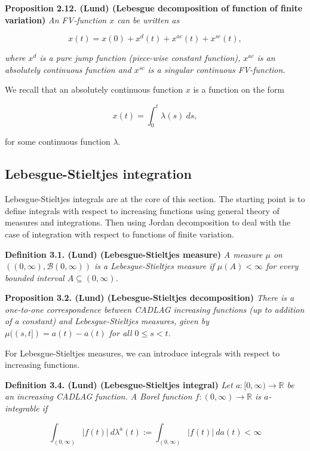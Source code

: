 \documentclass[a4paper,12pt,openany]{book}
\begin{document}
\textbf{Proposition 2.12. (Lund) (Lebesgue decomposition of function of finite variation)} \emph{An FV-function \(x\) can be written as}

\[
x(t)=x(0)+x^d(t)+x^{ac}(t)+x^{sc}(t),
\]

\emph{where \(x^d\) is a pure jump function (piece-wise constant function), \(x^{ac}\) is an absolutely continuous function and \(x^{sc}\) is a singular continuous FV-function.}

We recall that an absolutely continuous function \(x\) is a function on the form

\[
x(t)=\int_0^t\lambda(s)\ ds,
\]

for some continuous function \(\lambda\).

\hypertarget{lebesgue-stieltjes-integration}{%
\subsection{Lebesgue-Stieltjes integration}\label{lebesgue-stieltjes-integration}}

Lebesgue-Stieltjes integrals are at the core of this section. The starting point is to define integrals with respect to increasing functions using general theory of measures and integrations. Then using Jordan decomposition to deal with the case of integration with respect to functions of finite variation.

\textbf{Definition 3.1. (Lund) (Lebesgue-Stieltjes measure)} \emph{A measure \(\mu\) on \(((0,\infty),\mathcal B(0,\infty))\) is a Lebesgue-Stieltjes measure if \(\mu(A)<\infty\) for every bounded interval \(A\subseteq (0,\infty)\).}

\textbf{Proposition 3.2. (Lund) (Lebesgue-Stieltjes decomposition)} \emph{There is a one-to-one correspondence between CADLAG increasing functions (up to addition of a constant) and Lebesgue-Stieltjes measures, given by \(\mu((s,t])=a(t)-a(t)\) for all \(0\le s< t\).}

For Lebesgue-Stieltjes measures, we can introduce integrals with respect to increasing functions.

\textbf{Definition 3.4. (Lund) (Lebesgue-Stieltjes integral)} \emph{Let \(a : [0,\infty) \to \mathbb R\) be an increasing CADLAG function. A Borel function \(f:(0,\infty)\to\mathbb R\) is \(a\)-integrable if}

\[
\int_{(0,\infty)}\vert f(t)\vert\ d\lambda ^a(t):=\int_{(0,\infty)}\vert f(t)\vert\ da(t)<\infty
\]
\end{document}
